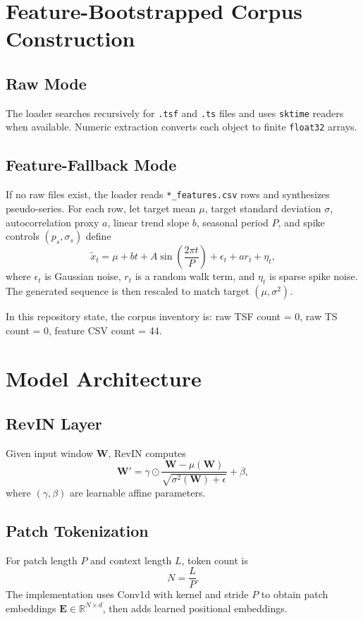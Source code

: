 \documentclass[conference]{IEEEtran}
\begin{document}
\section{Feature-Bootstrapped Corpus Construction}
\subsection{Raw Mode}
The loader searches recursively for \texttt{.tsf} and \texttt{.ts} files and uses \texttt{sktime} readers when available. Numeric extraction converts each object to finite \texttt{float32} arrays.

\subsection{Feature-Fallback Mode}
If no raw files exist, the loader reads \texttt{*\_features.csv} rows and synthesizes pseudo-series. For each row, let target mean $\mu$, target standard deviation $\sigma$, autocorrelation proxy $a$, linear trend slope $b$, seasonal period $P$, and spike controls $(p_s,\sigma_s)$ define
\begin{equation}
\tilde{x}_t = \mu + bt + A\sin\left(\frac{2\pi t}{P}\right) + \epsilon_t + a r_t + \eta_t,
\label{eq:synth}
\end{equation}
where $\epsilon_t$ is Gaussian noise, $r_t$ is a random walk term, and $\eta_t$ is sparse spike noise. The generated sequence is then rescaled to match target $(\mu,\sigma^2)$.

In this repository state, the corpus inventory is: raw TSF count = 0, raw TS count = 0, feature CSV count = 44.

\section{Model Architecture}
\subsection{RevIN Layer}
Given input window $\mathbf{W}$, RevIN computes
\begin{equation}
\mathbf{W}' = \gamma \odot \frac{\mathbf{W}-\mu(\mathbf{W})}{\sqrt{\sigma^2(\mathbf{W})+\epsilon}} + \beta,
\label{eq:revin}
\end{equation}
where $(\gamma,\beta)$ are learnable affine parameters.

\subsection{Patch Tokenization}
For patch length $P$ and context length $L$, token count is
\begin{equation}
N = \frac{L}{P}.
\label{eq:token_count}
\end{equation}
The implementation uses Conv1d with kernel and stride $P$ to obtain patch embeddings $\mathbf{E} \in \mathbb{R}^{N \times d}$, then adds learned positional embeddings.
\end{document}
